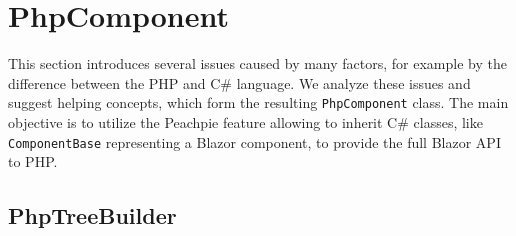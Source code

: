 \section{PhpComponent}

This section introduces several issues caused by many factors, for example by the difference between the PHP and C\# language.
We analyze these issues and suggest helping concepts, which form the resulting \texttt{PhpComponent} class.
The main objective is to utilize the Peachpie feature allowing to inherit C\# classes, like \texttt{ComponentBase} representing a Blazor component, to provide the full Blazor API to PHP.

\subsection{PhpTreeBuilder}

